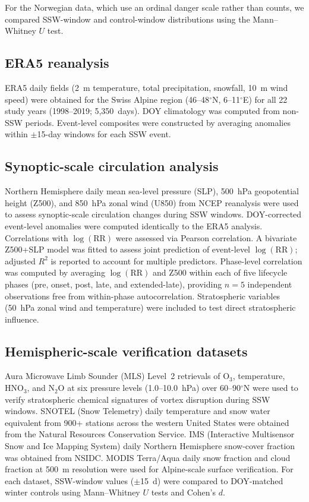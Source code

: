 \documentclass[11pt,letterpaper]{article}
\begin{document}
For the Norwegian data, which use an ordinal danger scale rather than counts, we compared SSW-window and control-window distributions using the Mann--Whitney $U$ test.

\subsection*{ERA5 reanalysis}

ERA5 daily fields (2~m temperature, total precipitation, snowfall, 10~m wind speed) were obtained for the Swiss Alpine region (46--48$^\circ$N, 6--11$^\circ$E) for all 22 study years (1998--2019; 5,350~days). DOY climatology was computed from non-SSW periods. Event-level composites were constructed by averaging anomalies within $\pm$15-day windows for each SSW event.

\subsection*{Synoptic-scale circulation analysis}

Northern Hemisphere daily mean sea-level pressure (SLP), 500~hPa geopotential height (Z500), and 850~hPa zonal wind (U850) from NCEP reanalysis were used to assess synoptic-scale circulation changes during SSW windows. DOY-corrected event-level anomalies were computed identically to the ERA5 analysis. Correlations with $\log(\mathrm{RR})$ were assessed via Pearson correlation. A bivariate Z500+SLP model was fitted to assess joint prediction of event-level $\log(\mathrm{RR})$; adjusted $R^2$ is reported to account for multiple predictors. Phase-level correlation was computed by averaging $\log(\mathrm{RR})$ and Z500 within each of five lifecycle phases (pre, onset, post, late, and extended-late), providing $n = 5$ independent observations free from within-phase autocorrelation. Stratospheric variables (50~hPa zonal wind and temperature) were included to test direct stratospheric influence.

\subsection*{Hemispheric-scale verification datasets}

Aura Microwave Limb Sounder (MLS) Level~2 retrievals of O$_3$, temperature, HNO$_3$, and N$_2$O at six pressure levels (1.0--10.0~hPa) over 60--90$^\circ$N were used to verify stratospheric chemical signatures of vortex disruption during SSW windows. SNOTEL (Snow Telemetry) daily temperature and snow water equivalent from 900+ stations across the western United States were obtained from the Natural Resources Conservation Service. IMS (Interactive Multisensor Snow and Ice Mapping System) daily Northern Hemisphere snow-cover fraction was obtained from NSIDC. MODIS Terra/Aqua daily snow fraction and cloud fraction at 500~m resolution were used for Alpine-scale surface verification. For each dataset, SSW-window values ($\pm$15~d) were compared to DOY-matched winter controls using Mann--Whitney $U$ tests and Cohen's $d$.
\end{document}

